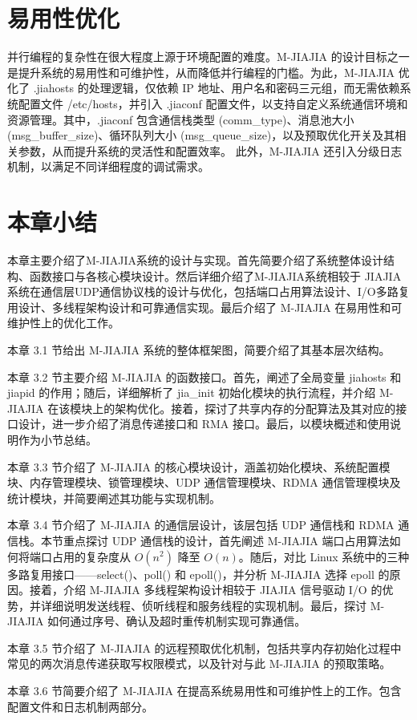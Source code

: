 {\section{易用性优化}
并行编程的复杂性在很大程度上源于环境配置的难度。M-JIAJIA 的设计目标之一是提升系统的易用性和可维护性，从而降低并行编程的门槛。为此，M-JIAJIA 优化了 .jiahosts 的处理逻辑，仅依赖 IP 地址、用户名和密码三元组，而无需依赖系统配置文件 /etc/hosts，并引入 .jiaconf 配置文件，以支持自定义系统通信环境和资源管理。其中，.jiaconf 包含通信栈类型 (comm\_type)、消息池大小 (msg\_buffer\_size)、循环队列大小 (msg\_queue\_size)，以及预取优化开关及其相关参数，从而提升系统的灵活性和配置效率。
此外，M-JIAJIA 还引入分级日志机制，以满足不同详细程度的调试需求。

\section{本章小结}
本章主要介绍了M-JIAJIA系统的设计与实现。首先简要介绍了系统整体设计结构、函数接口与各核心模块设计。然后详细介绍了M-JIAJIA系统相较于 JIAJIA 系统在通信层UDP通信协议栈的设计与优化，包括端口占用算法设计、I/O多路复用设计、多线程架构设计和可靠通信实现。最后介绍了 M-JIAJIA 在易用性和可维护性上的优化工作。

本章 3.1 节给出 M-JIAJIA 系统的整体框架图，简要介绍了其基本层次结构。

本章 3.2 节主要介绍 M-JIAJIA 的函数接口。首先，阐述了全局变量 jiahosts 和 jiapid 的作用；随后，详细解析了 jia\_init 初始化模块的执行流程，并介绍 M-JIAJIA 在该模块上的架构优化。接着，探讨了共享内存的分配算法及其对应的接口设计，进一步介绍了消息传递接口和 RMA 接口。最后，以模块概述和使用说明作为小节总结。

本章 3.3 节介绍了 M-JIAJIA 的核心模块设计，涵盖初始化模块、系统配置模块、内存管理模块、锁管理模块、UDP 通信管理模块、RDMA 通信管理模块及统计模块，并简要阐述其功能与实现机制。

本章 3.4 节介绍了 M-JIAJIA 的通信层设计，该层包括 UDP 通信栈和 RDMA 通信栈。本节重点探讨 UDP 通信栈的设计，首先阐述 M-JIAJIA 端口占用算法如何将端口占用的复杂度从 $O(n^2)$ 降至 $O(n)$。随后，对比 Linux 系统中的三种多路复用接口——select()、poll() 和 epoll()，并分析 M-JIAJIA 选择 epoll 的原因。接着，介绍 M-JIAJIA 多线程架构设计相较于 JIAJIA 信号驱动 I/O 的优势，并详细说明发送线程、侦听线程和服务线程的实现机制。最后，探讨 M-JIAJIA 如何通过序号、确认及超时重传机制实现可靠通信。

本章 3.5 节介绍了 M-JIAJIA 的远程预取优化机制，包括共享内存初始化过程中常见的两次消息传递获取写权限模式，以及针对与此 M-JIAJIA 的预取策略。

本章 3.6 节简要介绍了 M-JIAJIA 在提高系统易用性和可维护性上的工作。包含配置文件和日志机制两部分。

}
